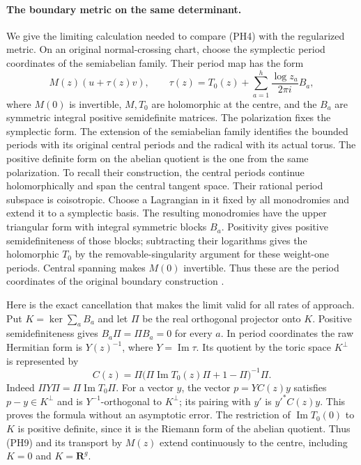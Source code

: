 \paragraph{The boundary metric on the same determinant.}
We give the limiting calculation needed to compare \textup{(PH4)}
with the regularized metric. On an original normal-crossing chart,
choose the symplectic period coordinates of the semiabelian family.
Their period map has the form
\[
 M(z)(u+\tau(z)v),\qquad
 \tau(z)=T_0(z)+\sum_{a=1}^{h}\frac{\log z_a}{2\pi i}B_a,
 \tag{PH8}
\]
where $M(0)$ is invertible, $M,T_0$ are holomorphic at the centre,
and the $B_a$ are symmetric integral positive semidefinite matrices.
The polarization fixes the symplectic form. The extension of the
semiabelian family identifies the bounded periods with its original
central periods and the radical with its actual torus. The positive
definite form on the abelian quotient is the one from the same
polarization. To recall their construction, the central periods continue
holomorphically and span the central tangent space. Their rational
period subspace is coisotropic. Choose a Lagrangian in it fixed by
all monodromies and extend it to a symplectic basis. The resulting
monodromies have the upper triangular form with integral symmetric
blocks $B_a$. Positivity gives positive semidefiniteness of those
blocks; subtracting their logarithms gives the holomorphic $T_0$
by the removable-singularity argument for these weight-one periods.
Central spanning makes $M(0)$ invertible. Thus these are the period
coordinates of the original boundary construction
\cite{actual-point-height-source}.

Here is the exact cancellation that makes the limit valid for all
rates of approach. Put $K=\ker\sum_aB_a$ and let $\Pi$ be the real
orthogonal projector onto $K$. Positive semidefiniteness gives
$B_a\Pi=\Pi B_a=0$ for every $a$. In period coordinates the raw
Hermitian form is $Y(z)^{-1}$, where $Y=\operatorname{Im}\tau$.
Its quotient by the toric space $K^\perp$ is represented by
\[
 C(z)=\Pi\bigl(\Pi\operatorname{Im}T_0(z)\Pi+1-\Pi\bigr)^{-1}\Pi.
 \tag{PH9}
\]
Indeed $\Pi Y\Pi=\Pi\operatorname{Im}T_0\Pi$. For a vector $y$,
the vector $p=YC(z)y$ satisfies $p-y\in K^\perp$ and is
$Y^{-1}$-orthogonal to $K^\perp$; its pairing with $y'$ is
$y'^*C(z)y$. This proves the formula without an asymptotic error.
The restriction of $\operatorname{Im}T_0(0)$ to $K$ is positive
definite, since it is the Riemann form of the abelian quotient.
Thus \textup{(PH9)} and its transport by $M(z)$ extend
continuously to the centre, including $K=0$ and $K=\mathbf R^g$.

